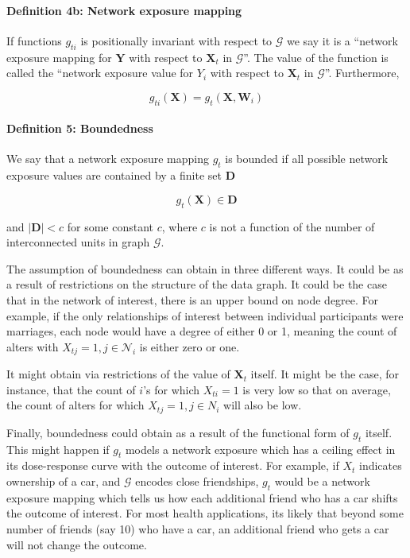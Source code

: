 \documentclass[
  letterpaper,
  DIV=11,
  numbers=noendperiod,
  oneside]{scrreprt}
\let\oldparagraph\paragraph
\renewcommand{\paragraph}[1]{\oldparagraph{#1}\mbox{}}
\begin{document}
\hypertarget{definition-4b-network-exposure-mapping}{%
\paragraph{\texorpdfstring{\textbf{Definition 4b: Network exposure
mapping}}{Definition 4b: Network exposure mapping}}\label{definition-4b-network-exposure-mapping}}

If functions \(g_{ti}\) is positionally invariant with respect to
\(\mathscr{G}\) we say it is a ``network exposure mapping for
\(\mathbf{Y}\) with respect to \(\mathbf{X}_t\) in \(\mathscr{G}\)''.
The value of the function is called the ``network exposure value for
\(Y_i\) with respect to \(\mathbf{X}_t\) in \(\mathscr{G}\)''.
Furthermore,

\[
g_{ti}(\mathbf{X}) = g_{t}(\mathbf{X}, \mathbf{W}_i)
\]

\hypertarget{definition-5-boundedness}{%
\paragraph{\texorpdfstring{\textbf{Definition 5:
Boundedness}}{Definition 5: Boundedness}}\label{definition-5-boundedness}}

We say that a network exposure mapping \(g_{t}\) is bounded if all
possible network exposure values are contained by a finite set
\(\mathbf{D}\)

\[
g_t(\mathbf{X})  \in \mathbf{D} 
\]

and \(|\mathbf{D}| < c\) for some constant \(c\), where \(c\) is not a
function of the number of interconnected units in graph \(\mathscr{G}\).

The assumption of boundedness can obtain in three different ways. It
could be as a result of restrictions on the structure of the data graph.
It could be the case that in the network of interest, there is an upper
bound on node degree. For example, if the only relationships of interest
between individual participants were marriages, each node would have a
degree of either 0 or 1, meaning the count of alters with
\(X_{tj} = 1, j \in \mathscr{N}_i\) is either zero or one.

It might obtain via restrictions of the value of \(\mathbf{X}_t\)
itself. It might be the case, for instance, that the count of \(i\)'s
for which \(X_{ti}=1\) is very low so that on average, the count of
alters for which \(X_{tj} = 1, j \in N_i\) will also be low.

Finally, boundedness could obtain as a result of the functional form of
\(g_t\) itself. This might happen if \(g_t\) models a network exposure
which has a ceiling effect in its dose-response curve with the outcome
of interest. For example, if \(X_t\) indicates ownership of a car, and
\(\mathscr{G}\) encodes close friendships, \(g_t\) would be a network
exposure mapping which tells us how each additional friend who has a car
shifts the outcome of interest. For most health applications, its likely
that beyond some number of friends (say 10) who have a car, an
additional friend who gets a car will not change the outcome.
\end{document}
